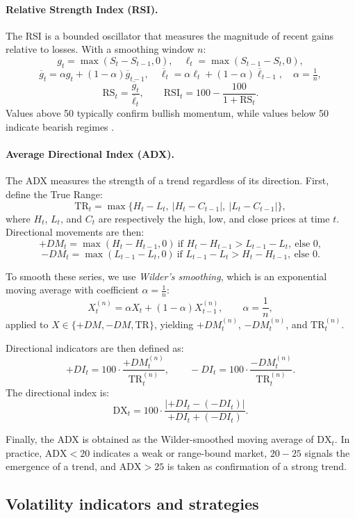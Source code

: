 \documentclass[12pt,a4paper]{report}
\begin{document}
\paragraph{Relative Strength Index (RSI).}  
The RSI \citep{wilder1978new} is a bounded oscillator that measures the magnitude of recent gains relative to losses. With a smoothing window $n$:
\[
g_t=\max(S_t-S_{t-1},0), \quad \ell_t=\max(S_{t-1}-S_t,0),
\]
\[
\overline{g}_t=\alpha g_t+(1-\alpha)\overline{g}_{t-1},\quad 
\overline{\ell}_t=\alpha \ell_t+(1-\alpha)\overline{\ell}_{t-1}, \quad \alpha=\tfrac{1}{n},
\]
\[
\text{RS}_t=\frac{\overline{g}_t}{\overline{\ell}_t}, \qquad \text{RSI}_t=100-\frac{100}{1+\text{RS}_t}.
\]
Values above 50 typically confirm bullish momentum, while values below 50 indicate bearish regimes \citep{brock1992simple}.

\paragraph{Average Directional Index (ADX).}  
The ADX \citep{wilder1978new} measures the strength of a trend regardless of its direction. First, define the True Range:
\[
\text{TR}_t=\max\{H_t-L_t,\ |H_t-C_{t-1}|,\ |L_t-C_{t-1}|\},
\]
where $H_t$, $L_t$, and $C_t$ are respectively the high, low, and close prices at time $t$. Directional movements are then:
\[
+DM_t=\max(H_t-H_{t-1},0) \ \text{if } H_t-H_{t-1} > L_{t-1}-L_t,\ \text{else } 0,
\]
\[
-DM_t=\max(L_{t-1}-L_t,0) \ \text{if } L_{t-1}-L_t > H_t-H_{t-1},\ \text{else } 0.
\]

To smooth these series, we use \textit{Wilder’s smoothing}, which is an exponential moving average with coefficient $\alpha=\tfrac{1}{n}$:
\[
X^{(n)}_t=\alpha X_t+(1-\alpha)X^{(n)}_{t-1}, \qquad \alpha=\frac{1}{n},
\]
applied to $X\in\{+DM, -DM, \text{TR}\}$, yielding $+DM^{(n)}_t$, $-DM^{(n)}_t$, and $\text{TR}^{(n)}_t$.

Directional indicators are then defined as:
\[
+DI_t=100\cdot\frac{+DM^{(n)}_t}{\text{TR}^{(n)}_t}, \qquad
-DI_t=100\cdot\frac{-DM^{(n)}_t}{\text{TR}^{(n)}_t}.
\]
The directional index is:
\[
\text{DX}_t=100\cdot\frac{|+DI_t-(-DI_t)|}{+DI_t+(-DI_t)}.
\]

Finally, the ADX is obtained as the Wilder-smoothed moving average of $\text{DX}_t$. In practice, $\text{ADX}<20$ indicates a weak or range-bound market, $20\!-\!25$ signals the emergence of a trend, and $\text{ADX}>25$ is taken as confirmation of a strong trend.


\subsection{Volatility indicators and strategies}
\end{document}
